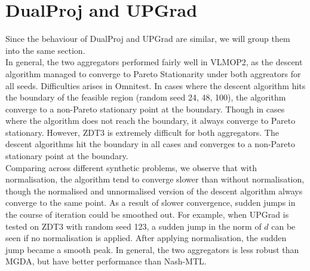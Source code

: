 \documentclass{article}
\renewcommand{\|}{\biggr|}
\begin{document}
    \section{DualProj and UPGrad}
    Since the behaviour of DualProj and UPGrad are similar, we will group them into the same section.\\
    In general, the two aggregators performed fairly well in VLMOP2, as the descent algorithm managed to converge to Pareto Stationarity under both aggreators for all seeds. Difficulties arises in Omnitest. In cases where the descent algorithm hits the boundary of the feasible region (random seed 24, 48, 100), the algorithm converge to a non-Pareto stationary point at the boundary. Though in cases where the algorithm does not reach the boundary, it always converge to Pareto stationary. However, ZDT3 is extremely difficult for both aggregators. The descent algorithms hit the boundary in all cases and converges to a non-Pareto stationary point at the boundary.\\
    Comparing across different synthetic problems, we observe that with normalisation, the algorithm tend to converge slower than without normalisation, though the normalised and unnormalised version of the descent algorithm always converge to the same point. As a result of slower convergence, sudden jumps in the course of iteration could be smoothed out. For example, when UPGrad is tested on ZDT3 with random seed 123, a sudden jump in the norm of $d$ can be seen if no normalisation is applied. After applying normalisation, the sudden jump became a smooth peak. In general, the two aggregators is less robust than MGDA, but have better performance than Nash-MTL.
\end{document}
